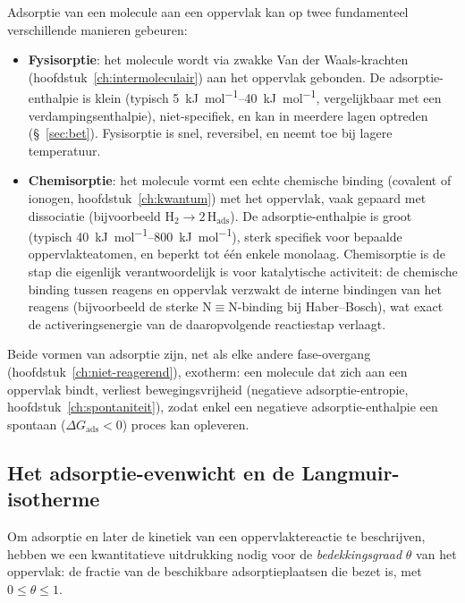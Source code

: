 Adsorptie van een molecule aan een oppervlak kan op twee fundamenteel verschillende manieren gebeuren:
\begin{itemize}
\item \textbf{Fysisorptie}: het molecule wordt via zwakke Van der Waals-krachten (hoofdstuk~\ref{ch:intermoleculair}) aan het oppervlak gebonden. De adsorptie-enthalpie is klein (typisch \SIrange{5}{40}{\kilo\joule\per\mole}, vergelijkbaar met een verdampingsenthalpie), niet-specifiek, en kan in meerdere lagen optreden (\S~\ref{sec:bet}). Fysisorptie is snel, reversibel, en neemt toe bij lagere temperatuur.
\item \textbf{Chemisorptie}: het molecule vormt een echte chemische binding (covalent of ionogen, hoofdstuk~\ref{ch:kwantum}) met het oppervlak, vaak gepaard met dissociatie (bijvoorbeeld $\mathrm{H_2}\to2\,\mathrm{H}_{\text{ads}}$). De adsorptie-enthalpie is groot (typisch \SIrange{40}{800}{\kilo\joule\per\mole}), sterk specifiek voor bepaalde oppervlakteatomen, en beperkt tot \'e\'en enkele monolaag. Chemisorptie is de stap die eigenlijk verantwoordelijk is voor katalytische activiteit: de chemische binding tussen reagens en oppervlak verzwakt de interne bindingen van het reagens (bijvoorbeeld de sterke $\mathrm{N\equiv N}$-binding bij Haber--Bosch), wat exact de activeringsenergie van de daaropvolgende reactiestap verlaagt.
\end{itemize}
Beide vormen van adsorptie zijn, net als elke andere fase-overgang (hoofdstuk~\ref{ch:niet-reagerend}), exotherm: een molecule dat zich aan een oppervlak bindt, verliest bewegingsvrijheid (negatieve adsorptie-entropie, hoofdstuk~\ref{ch:spontaniteit}), zodat enkel een negatieve adsorptie-enthalpie een spontaan ($\Delta G_{\text{ads}}<0$) proces kan opleveren.

\subsection{Het adsorptie-evenwicht en de Langmuir-isotherme}
\label{sec:langmuir-isotherm-kinetiek}

Om adsorptie en later de kinetiek van een oppervlaktereactie te beschrijven, hebben we een kwantitatieve uitdrukking nodig voor de \emph{bedekkingsgraad} $\theta$ van het oppervlak: de fractie van de beschikbare adsorptieplaatsen die bezet is, met $0\leq\theta\leq1$.

